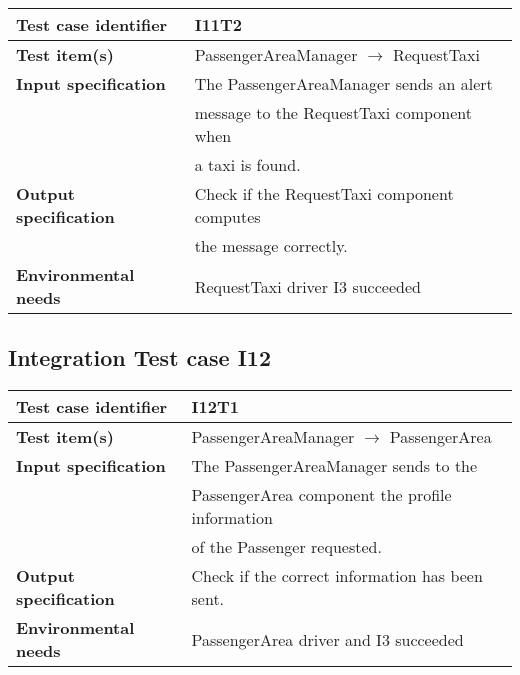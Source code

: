 		\noindent
		\begin{adjustbox}{max width=\textwidth}
			\begin{tabular}{ l l}
				\hline 		\textbf{Test case identifier} & I11T2 \\
				\hline		\textbf{Test item(s)}  & PassengerAreaManager $\rightarrow$ RequestTaxi \\
				\hline		\textbf{Input specification} & The PassengerAreaManager sends an alert \\ & message to the RequestTaxi component when\\ & a taxi is found.\\
				\hline		\textbf{Output specification} & Check if the RequestTaxi component computes\\ & the  message correctly.\\
				\hline		\textbf{Environmental needs} & RequestTaxi driver I3 succeeded\\
				\hline
			\end{tabular}
		\end{adjustbox}
	
	\hypertarget{chapter 3.12}{ }
	\subsection{Integration Test case I12}
		\begin{adjustbox}{max width=\textwidth}
			\begin{tabular}{ l l}
				\hline 		\textbf{Test case identifier} & I12T1 \\
				\hline		\textbf{Test item(s)}  & PassengerAreaManager $\rightarrow$ PassengerArea \\
				\hline		\textbf{Input specification} & The PassengerAreaManager sends to the\\ &  PassengerArea component the profile information\\ &  of the Passenger requested.\\
				\hline		\textbf{Output specification} & Check if the correct information has been sent.\\
				\hline		\textbf{Environmental needs} & PassengerArea driver and I3 succeeded\\
				\hline
			\end{tabular}
		\end{adjustbox}
		
